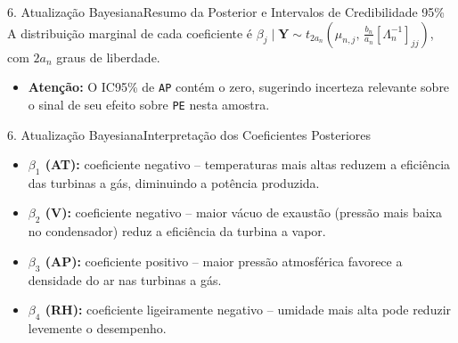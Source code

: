 \documentclass[10pt,aspectratio=169]{beamer}
\begin{document}
\begin{frame}{6. Atualização Bayesiana}{Resumo da Posterior e Intervalos de Credibilidade 95\%}
    A distribuição marginal de cada coeficiente é $\beta_j \mid \mathbf{Y} \sim t_{2a_n}\left(\mu_{n,j},\, \frac{b_n}{a_n}[\Lambda_n^{-1}]_{jj}\right)$, com $2a_n$ graus de liberdade.
    \begin{table}
        \centering
        \caption{Resumo da Distribuição Posterior dos Coeficientes}
    \end{table}
    \begin{itemize}
        \item \textbf{Atenção:} O IC95\% de \texttt{AP} contém o zero, sugerindo incerteza relevante sobre o sinal de seu efeito sobre \texttt{PE} nesta amostra.
    \end{itemize}
\end{frame}

\begin{frame}{6. Atualização Bayesiana}{Interpretação dos Coeficientes Posteriores}
    \begin{itemize}
        \item \textbf{$\beta_1$ (AT):} coeficiente negativo -- temperaturas mais altas reduzem a eficiência das turbinas a gás, diminuindo a potência produzida.
        \item \textbf{$\beta_2$ (V):} coeficiente negativo -- maior vácuo de exaustão (pressão mais baixa no condensador) reduz a eficiência da turbina a vapor.
        \item \textbf{$\beta_3$ (AP):} coeficiente positivo -- maior pressão atmosférica favorece a densidade do ar nas turbinas a gás.
        \item \textbf{$\beta_4$ (RH):} coeficiente ligeiramente negativo -- umidade mais alta pode reduzir levemente o desempenho.
    \end{itemize}
\end{frame}
\end{document}
